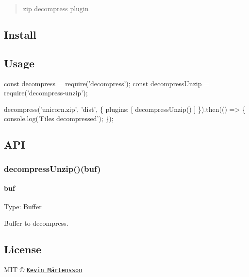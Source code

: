 \begin{quote}
zip decompress plugin \end{quote}


\subsection*{Install}




\subsection*{Usage}


\begin{DoxyCode}
const decompress = require('decompress');
const decompressUnzip = require('decompress-unzip');

decompress('unicorn.zip', 'dist', \{
  plugins: [
    decompressUnzip()
  ]
\}).then(() => \{
  console.log('Files decompressed');
\});
\end{DoxyCode}


\subsection*{A\+PI}

\subsubsection*{decompress\+Unzip()(buf)}

\paragraph*{buf}

Type\+: {\ttfamily Buffer}

Buffer to decompress.

\subsection*{License}

M\+IT © \href{https://github.com/kevva}{\tt Kevin Mårtensson} 
